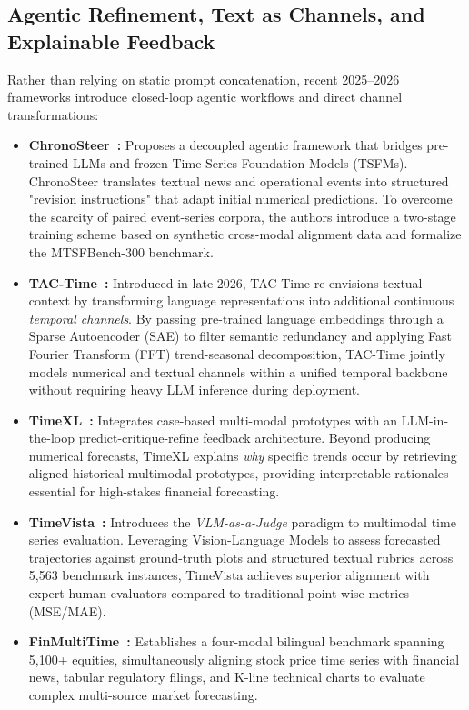 \subsection{Agentic Refinement, Text as Channels, and Explainable Feedback}
Rather than relying on static prompt concatenation, recent 2025--2026 frameworks introduce closed-loop agentic workflows and direct channel transformations:
\begin{itemize}
    \item \textbf{ChronoSteer~\cite{Wang2025ChronoSteer}:} Proposes a decoupled agentic framework that bridges pre-trained LLMs and frozen Time Series Foundation Models (TSFMs). ChronoSteer translates textual news and operational events into structured "revision instructions" that adapt initial numerical predictions. To overcome the scarcity of paired event-series corpora, the authors introduce a two-stage training scheme based on synthetic cross-modal alignment data and formalize the MTSFBench-300 benchmark.
    \item \textbf{TAC-Time~\cite{Liang2026TACTime}:} Introduced in late 2026, TAC-Time re-envisions textual context by transforming language representations into additional continuous \textit{temporal channels}. By passing pre-trained language embeddings through a Sparse Autoencoder (SAE) to filter semantic redundancy and applying Fast Fourier Transform (FFT) trend-seasonal decomposition, TAC-Time jointly models numerical and textual channels within a unified temporal backbone without requiring heavy LLM inference during deployment.
    \item \textbf{TimeXL~\cite{Jiang2025TimeXL}:} Integrates case-based multi-modal prototypes with an LLM-in-the-loop predict-critique-refine feedback architecture. Beyond producing numerical forecasts, TimeXL explains \textit{why} specific trends occur by retrieving aligned historical multimodal prototypes, providing interpretable rationales essential for high-stakes financial forecasting.
    \item \textbf{TimeVista~\cite{Chen2026TimeVista}:} Introduces the \textit{VLM-as-a-Judge} paradigm to multimodal time series evaluation. Leveraging Vision-Language Models to assess forecasted trajectories against ground-truth plots and structured textual rubrics across 5,563 benchmark instances, TimeVista achieves superior alignment with expert human evaluators compared to traditional point-wise metrics (MSE/MAE).
    \item \textbf{FinMultiTime~\cite{Guo2025FinMultiTime}:} Establishes a four-modal bilingual benchmark spanning 5,100+ equities, simultaneously aligning stock price time series with financial news, tabular regulatory filings, and K-line technical charts to evaluate complex multi-source market forecasting.
\end{itemize}

